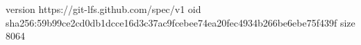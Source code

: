 version https://git-lfs.github.com/spec/v1
oid sha256:59b99ce2cd0db1dcce16d3c37ac9fcebee74ea20fec4934b266be6ebe75f439f
size 8064
